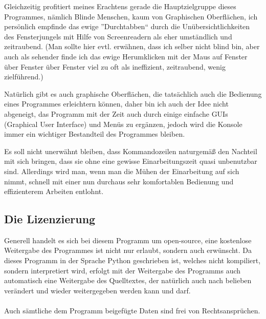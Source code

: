 \documentclass[a4paper]{scrartcl}
\begin{document}
Gleichzeitig profitiert meines Erachtens gerade die Hauptzielgruppe dieses Programmes, nämlich Blinde Menschen, kaum von Graphischen Oberflächen, ich persönlich empfinde das ewige ''Durchtabben`` durch die Unübersichtlichkeiten des Fensterjungels mit Hilfe von Screenreadern als eher umständlich und zeitraubend. (Man sollte hier evtl. erwähnen, dass ich selber nicht blind bin, aber auch als sehender finde ich das ewige Herumklicken mit der Maus auf Fenster über Fenster über Fenster viel zu oft als ineffizient, zeitraubend, wenig zielführend.)

Natürlich gibt es auch graphische Oberflächen, die tatsächlich auch die Bedienung eines Programmes erleichtern können, daher bin ich auch der Idee nicht abgeneigt, das Programm mit der Zeit auch durch einige einfache GUIs (Graphical User Interface) und Menüs zu ergänzen, jedoch wird die Konsole immer ein wichtiger Bestandteil des Programmes bleiben.

Es soll nicht unerwähnt bleiben, dass Kommandozeilen naturgemäß den Nachteil mit sich bringen, dass sie ohne eine gewisse Einarbeitungszeit quasi unbenutzbar sind. Allerdings wird man, wenn man die Mühen der Einarbeitung auf sich nimmt, schnell mit einer nun durchaus sehr komfortablen Bedienung und effizienterem Arbeiten entlohnt.



\subsection{Die Lizenzierung}
Generell handelt es sich bei diesem Programm um open-source, eine kostenlose Weitergabe des Programmes ist nicht nur erlaubt, sondern auch erwünscht. Da dieses Programm in der Sprache Python geschrieben ist, welches nicht kompiliert, sondern interpretiert wird, erfolgt mit der Weitergabe des Programms auch automatisch eine Weitergabe des Quelltextes, der natürlich auch nach belieben verändert und wieder weitergegeben werden kann und darf.
\\\\
Auch sämtliche dem Programm beigefügte Daten sind frei von Rechtsansprüchen.
\end{document}
